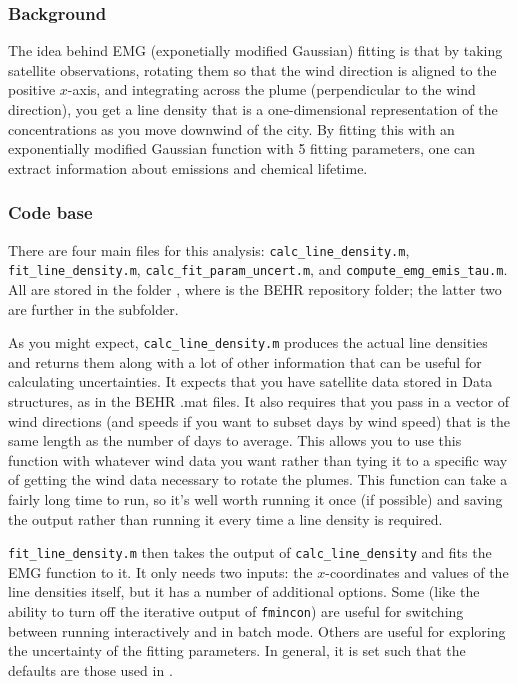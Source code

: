 \documentclass[12pt]{article}
\begin{document}
		\subsubsection{Background}
		The idea behind EMG (exponetially modified Gaussian) fitting is that by taking satellite  observations, rotating them so that the wind direction is aligned to the positive $x$-axis, and integrating across the plume (perpendicular to the wind direction), you get a line density that is a one-dimensional representation of the  concentrations as you move downwind of the city. By fitting this with an exponentially modified Gaussian function with 5 fitting parameters, one can extract information about emissions and chemical lifetime.
		
		\subsubsection{Code base}
		There are four main files for this analysis: \lstinline$calc_line_density.m$, \lstinline$fit_line_density.m$, \lstinline$calc_fit_param_uncert.m$, and \lstinline$compute_emg_emis_tau.m$.  All are stored in the folder , where  is the BEHR repository folder; the latter two are further in the  subfolder.
		
		As you might expect, \lstinline$calc_line_density.m$ produces the actual line densities and returns them along with a lot of other information that can be useful for calculating uncertainties. It expects that you have satellite data stored in Data structures, as in the BEHR .mat files. It also requires that you pass in a vector of wind directions (and speeds if you want to subset days by wind speed) that is the same length as the number of days to average. This allows you to use this function with whatever wind data you want rather than tying it to a specific way of getting the wind data necessary to rotate the plumes. This function can take a fairly long time to run, so it's well worth running it once (if possible) and saving the output rather than running it every time a line density is required.
		
		\lstinline$fit_line_density.m$ then takes the output of \lstinline$calc_line_density$ and fits the EMG function to it. It only needs two inputs: the $x$-coordinates and values of the line densities itself, but it has a number of additional options. Some (like the ability to turn off the iterative output of \lstinline$fmincon$) are useful for switching between running interactively and in batch mode. Others are useful for exploring the uncertainty of the fitting parameters. In general, it is set such that the defaults are those used in \citet{laughner16}.
		
\end{document}
